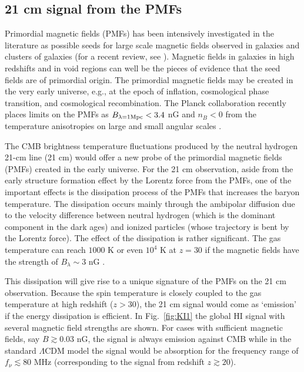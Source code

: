\documentclass{PoS}
\begin{document}
\subsection{21 cm signal from the PMFs}

Primordial magnetic fields (PMFs) has been intensively investigated in
the literature as possible seeds for large scale magnetic fields
observed in galaxies and clusters of galaxies (for a recent review, see
\cite{2013A&ARv..21...62D}).  Magnetic fields in galaxies in high
redshifts \cite{2008Natur.454..302B} and in void regions
\cite{2010Sci...328...73N,2010ApJ...722L..39A,2013ApJ...771L..42T} can
well be the pieces of evidence that the seed fields are of primordial
origin.  The primordial magnetic fields may be created in the very
early universe, e.g., at the epoch of inflation, cosmological phase
transition, and cosmological recombination.  
The Planck collaboration
recently places limits on the PMFs as $B_{\lambda=1{\rm Mpc}} < 3.4$ nG and $n_B<0$
from the temperature anisotropies on large and small angular scales
\cite{2013arXiv1303.5076P}. 

The CMB brightness temperature fluctuations produced by the neutral
hydrogen 21-cm line (21 cm) would offer a new probe of the primordial
magnetic fields (PMFs) created in the early universe. For the 21 cm
observation, aside from the early structure formation effect by the
Lorentz force from the PMFs, one of the important effects is the
dissipation process of the PMFs that increases the baryon
temperature. The dissipation occurs mainly through the ambipolar
diffusion due to the velocity difference between neutral hydrogen (which
is the dominant component in the dark ages) and ionized particles (whose
trajectory is bent by the Lorentz force).  The effect of the dissipation
is rather significant. The gas temperature can reach $1000$ K or even
$10^4$ K at $z=30$ if the magnetic fields have the strength of
$B_\lambda \sim 3$ nG
\cite{2005MNRAS.356..778S,2006MNRAS.372.1060T,2009ApJ...692..236S,2014JCAP...01..009K}.

This dissipation will give rise to a unique signature of the PMFs on the
21 cm observation. Because the spin temperature is closely coupled to
the gas temperature at high redshift ($z>30$), the 21 cm signal would
come as `emission' if the energy dissipation is efficient. In
Fig.~\ref{fig:KI1} the global HI signal with several magnetic field
strengths are shown. For cases with sufficient magnetic fields, say
$B\gtrsim 0.03$ nG, the signal is always emission against CMB while in
the standard $\Lambda$CDM model the signal would be absorption for the
frequency range of $f_\nu \lesssim 80$ MHz (corresponding to the signal
from redshift $z\gtrsim 20$).
\end{document}
